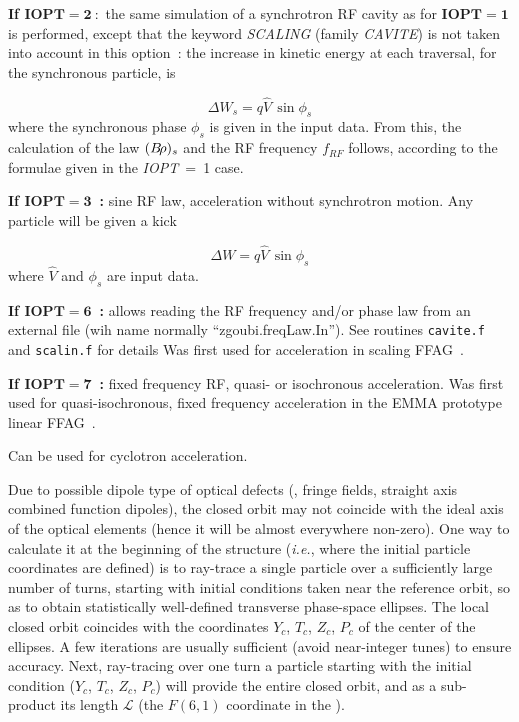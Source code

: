 \noindent\textbf{If $\mathbf{IOPT  =  2~:}$} the same simulation of a synchrotron RF cavity 
as for $\mathbf{IOPT  =  1}$ is performed, except that the keyword 
\textsl{SCALING} (family \textsl{CAVITE}) is not taken into 
account in this option~: the increase in kinetic energy at each traversal, 
for the synchronous particle, is

$$ \Delta W_s= q\hat  V \,\sin\phi_ s $$
%
where the synchronous phase $ \phi_ s $ is given in the input data.
From this, the calculation of the law $ (B\!\rho )_s $ and the RF frequency 
$f_{RF} $ follows, according to the formulae given in the \mbox{\textsl{IOPT}  =  1} case. 

\bigskip

\noindent\textbf{If $\mathbf{IOPT  =  3}$~:} sine RF law, acceleration without synchrotron motion. 
Any particle will be given a kick

$$ \Delta W = q\hat  V\, \sin\phi_ s $$
%
where $ \hat  V $ and $ \phi_ s $ are input data.  

\bigskip

\noindent\textbf{If $\mathbf{IOPT  =  6}$~:}  
allows reading the RF frequency and/or phase law from an external file (wih name normally ``zgoubi.freqLaw.In''). 
See routines \texttt{cavite.f} and \texttt{scalin.f} for details
Was first used for  acceleration  in scaling FFAG~\cite{reportNIMFFAGSPI}.   


\bigskip

\noindent\textbf{If $\mathbf{IOPT  =  7}$~:} fixed frequency RF, quasi- or isochronous acceleration. Was 
first used for quasi-isochronous, fixed frequency acceleration in the EMMA prototype 
linear FFAG~\cite{repDapniaEMMA,EMMAIPAC10}. 

\noindent Can be used for  cyclotron  acceleration. 



\bigskip

       

\medskip

\noindent Due to possible dipole type of optical defects (\eg, fringe fields, straight axis 
combined function dipoles), the closed orbit may not 
coincide with the ideal axis of the optical elements (hence it will be almost everywhere non-zero). One way to 
calculate it at the beginning of the structure (\emph{i.e.}, where the 
initial particle coordinates are defined) is to ray-trace 
a single particle over a sufficiently large number of turns, 
starting with   initial conditions  taken near the reference orbit, so as to 
obtain  statistically well-defined transverse phase-space ellipses. The 
local closed orbit  coincides with the 
coordinates $ Y_c $,  $ T_c $, $ Z_c $,  $ P_c $ of the center of the ellipses. 
A few iterations are usually sufficient (avoid near-integer tunes) to ensure accuracy.  Next, 
ray-tracing over one turn a particle starting with the initial condition 
($Y_c $, $ T_c $, $ Z_c$, $P_c$)  will provide the entire closed orbit, and as a sub-product its   length $\mathcal{L}$ 
(the $ F(6,1) $ coordinate in the \FORTRAN). 

